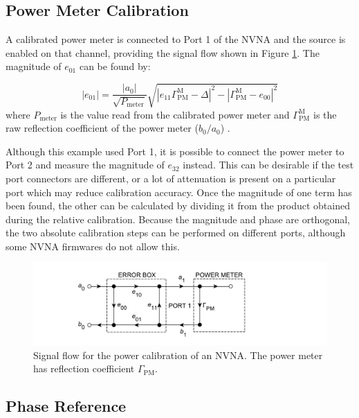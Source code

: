\documentclass[../thesis/thesis.tex]{subfiles}
\begin{document}
\begin{refsection}
\subsection{Power Meter Calibration}

A calibrated power meter is connected to Port 1 of the NVNA and the source is enabled on that channel, providing the signal flow shown in Figure \ref{ch2_fig_powercal}. The magnitude of $e_{01}$ can be found by:

\begin{equation}
	|e_{01}| = \frac{|a_0|}{\sqrt{P_\textrm{meter}}}\sqrt{|e_{11}\Gamma^\textrm{M}_\textrm{PM}-\Delta|^2-|\Gamma^\textrm{M}_\textrm{PM}-e_{00}|^2}
\end{equation}
where $P_\textrm{meter}$ is the value read from the calibrated power meter and $\Gamma^\textrm{M}_\textrm{PM}$ is the raw reflection coefficient of the power meter ($b_0/a_0$) \cite{Lin_2012}.

Although this example used Port 1, it is possible to connect the power meter to Port 2 and measure the magnitude of $e_{32}$ instead. This can be desirable if the test port connectors are different, or a lot of attenuation is present on a particular port which may reduce calibration accuracy. Once the magnitude of one term has been found, the other can be calculated by dividing it from the product obtained during the relative calibration. Because the magnitude and phase are orthogonal, the two absolute calibration steps can be performed on different ports, although some NVNA firmwares do not allow this.

\begin{figure}
	\centering
	\includegraphics[width=\textwidth]{ch2_powercal}
	\caption{Signal flow for the power calibration of an NVNA. The power meter has reflection coefficient $\Gamma_\textrm{PM}$.}
	\label{ch2_fig_powercal}
\end{figure}

\subsection{Phase Reference}


\end{refsection}
\end{document}
